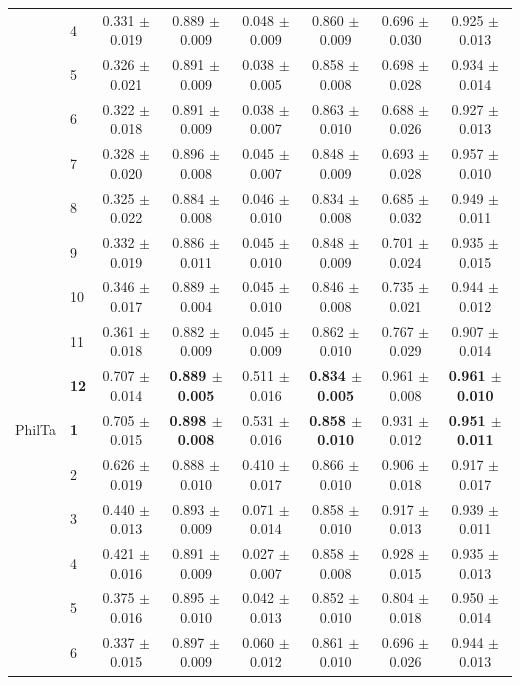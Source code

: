 \begin{longtable}{llcccccc}
 & 4 & 0.331 $\pm$ 0.019 & 0.889 $\pm$ 0.009 & 0.048 $\pm$ 0.009 & 0.860 $\pm$ 0.009 & 0.696 $\pm$ 0.030 & 0.925 $\pm$ 0.013 \\
 & 5 & 0.326 $\pm$ 0.021 & 0.891 $\pm$ 0.009 & 0.038 $\pm$ 0.005 & 0.858 $\pm$ 0.008 & 0.698 $\pm$ 0.028 & 0.934 $\pm$ 0.014 \\
 & 6 & 0.322 $\pm$ 0.018 & 0.891 $\pm$ 0.009 & 0.038 $\pm$ 0.007 & 0.863 $\pm$ 0.010 & 0.688 $\pm$ 0.026 & 0.927 $\pm$ 0.013 \\
 & 7 & 0.328 $\pm$ 0.020 & 0.896 $\pm$ 0.008 & 0.045 $\pm$ 0.007 & 0.848 $\pm$ 0.009 & 0.693 $\pm$ 0.028 & 0.957 $\pm$ 0.010 \\
 & 8 & 0.325 $\pm$ 0.022 & 0.884 $\pm$ 0.008 & 0.046 $\pm$ 0.010 & 0.834 $\pm$ 0.008 & 0.685 $\pm$ 0.032 & 0.949 $\pm$ 0.011 \\
 & 9 & 0.332 $\pm$ 0.019 & 0.886 $\pm$ 0.011 & 0.045 $\pm$ 0.010 & 0.848 $\pm$ 0.009 & 0.701 $\pm$ 0.024 & 0.935 $\pm$ 0.015 \\
 & 10 & 0.346 $\pm$ 0.017 & 0.889 $\pm$ 0.004 & 0.045 $\pm$ 0.010 & 0.846 $\pm$ 0.008 & 0.735 $\pm$ 0.021 & 0.944 $\pm$ 0.012 \\
 & 11 & 0.361 $\pm$ 0.018 & 0.882 $\pm$ 0.009 & 0.045 $\pm$ 0.009 & 0.862 $\pm$ 0.010 & 0.767 $\pm$ 0.029 & 0.907 $\pm$ 0.014 \\
 & \textbf{12} & 0.707 $\pm$ 0.014 & \textbf{0.889 $\pm$ 0.005} & 0.511 $\pm$ 0.016 & \textbf{0.834 $\pm$ 0.005} & 0.961 $\pm$ 0.008 & \textbf{0.961 $\pm$ 0.010} \\
\midrule
PhilTa & \textbf{1} & 0.705 $\pm$ 0.015 & \textbf{0.898 $\pm$ 0.008} & 0.531 $\pm$ 0.016 & \textbf{0.858 $\pm$ 0.010} & 0.931 $\pm$ 0.012 & \textbf{0.951 $\pm$ 0.011} \\
 & 2 & 0.626 $\pm$ 0.019 & 0.888 $\pm$ 0.010 & 0.410 $\pm$ 0.017 & 0.866 $\pm$ 0.010 & 0.906 $\pm$ 0.018 & 0.917 $\pm$ 0.017 \\
 & 3 & 0.440 $\pm$ 0.013 & 0.893 $\pm$ 0.009 & 0.071 $\pm$ 0.014 & 0.858 $\pm$ 0.010 & 0.917 $\pm$ 0.013 & 0.939 $\pm$ 0.011 \\
 & 4 & 0.421 $\pm$ 0.016 & 0.891 $\pm$ 0.009 & 0.027 $\pm$ 0.007 & 0.858 $\pm$ 0.008 & 0.928 $\pm$ 0.015 & 0.935 $\pm$ 0.013 \\
 & 5 & 0.375 $\pm$ 0.016 & 0.895 $\pm$ 0.010 & 0.042 $\pm$ 0.013 & 0.852 $\pm$ 0.010 & 0.804 $\pm$ 0.018 & 0.950 $\pm$ 0.014 \\
 & 6 & 0.337 $\pm$ 0.015 & 0.897 $\pm$ 0.009 & 0.060 $\pm$ 0.012 & 0.861 $\pm$ 0.010 & 0.696 $\pm$ 0.026 & 0.944 $\pm$ 0.013 \\

\end{longtable}
